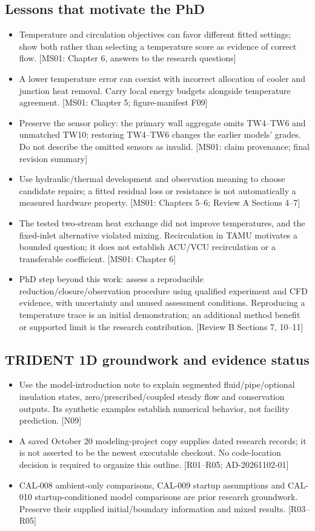 \subsection{Lessons that motivate the PhD}
\begin{itemize}[leftmargin=*]
\item Temperature and circulation objectives can favor different fitted settings; show both rather than selecting a temperature score as evidence of correct flow. [MS01: Chapter 6, answers to the research questions]
\item A lower temperature error can coexist with incorrect allocation of cooler and junction heat removal. Carry local energy budgets alongside temperature agreement. [MS01: Chapter 5; figure-manifest F09]
\item Preserve the sensor policy: the primary wall aggregate omits TW4--TW6 and unmatched TW10; restoring TW4--TW6 changes the earlier models' grades. Do not describe the omitted sensors as invalid. [MS01: claim provenance; final revision summary]
\item Use hydraulic/thermal development and observation meaning to choose candidate repairs; a fitted residual loss or resistance is not automatically a measured hardware property. [MS01: Chapters 5--6; Review A Sections 4--7]
\item The tested two-stream heat exchange did not improve temperatures, and the fixed-inlet alternative violated mixing. Recirculation in TAMU motivates a bounded question; it does not establish ACU/VCU recirculation or a transferable coefficient. [MS01: Chapter 6]
\item PhD step beyond this work: assess a reproducible reduction/closure/observation procedure using qualified experiment and CFD evidence, with uncertainty and unused assessment conditions. Reproducing a temperature trace is an initial demonstration; an additional method benefit or supported limit is the research contribution. [Review B Sections 7, 10--11]
\end{itemize}

\subsection{TRIDENT 1D groundwork and evidence status}
\begin{itemize}[leftmargin=*]
\item Use the model-introduction note to explain segmented fluid/pipe/optional insulation states, zero/prescribed/coupled steady flow and conservation outputs. Its synthetic examples establish numerical behavior, not facility prediction. [N09]
\item A saved October 20 modeling-project copy supplies dated research records; it is not asserted to be the newest executable checkout. No code-location decision is required to organize this outline. [R01--R05; AD-20261102-01]
\item CAL-008 ambient-only comparisons, CAL-009 startup assumptions and CAL-010 startup-conditioned model comparisons are prior research groundwork. Preserve their supplied initial/boundary information and mixed results. [R03--R05]
\end{itemize}


